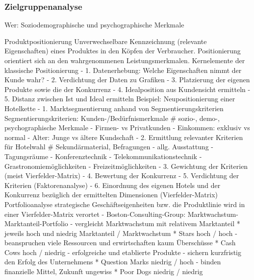 \subsubsection{Zielgruppenanalyse}
Wer: Soziodemographische und psychographische Merkmale      

Produktpositionierung
	Unverwechselbare Kennzeichnung (relevante Eigenschaften) eines
	Produktes in den Köpfen der Verbraucher. Positionierung orientiert
	sich an den wahrgenommenen Leistungsmerkmalen.
 Kernelemente der klassische Positionierung
	- 1. Datenerhebung: Welche Eigenschaften nimmt der Kunde wahr?
	- 2. Verdichtung der Daten zu Grafiken
	- 3. Platzierung der eigenen Produkte sowie die der Konkurrenz
	- 4. Idealposition aus Kundensicht ermitteln
	- 5. Distanz zwischen Ist und Ideal ermitteln
 Beispiel: Neupositionierung einer Hotelkette
	- 1. Marktsegmentierung anhand von Segmentierungskriterien
		Segmentierungskriterien: Kunden-/Bedürfnismerkmale
		# sozio-, demo-, psychographische Merkmale
		- Firmen- vs Privatkunden
		- Einkommen: exklusiv vs normal
		- Alter: Junge vs ältere Kundschaft
	- 2. Ermittlung relevanter Kriterien für Hotelwahl
		# Sekundärmaterial, Befragungen
		- allg. Ausstattung
		- Tagungsräume
		- Konferenztechnik
		- Telekommunikationstechnik
		- Grastronomiemöglichkeiten
		- Freizeitmöglichkeiten
	- 3. Gewichtung der Kriterien (meist Vierfelder-Matrix)
	- 4. Bewertung der Konkurrenz
	- 5. Verdichtung der Kriterien (Faktorenanalyse)
	- 6. Einordnung des eigenen Hotels und der Konkurrenz bezüglich der
	 ermittelten Dimensionen (Vierfelder-Matrix)
Portfolioanalyse
	strategische Geschäftseigenheiten bzw. die Produktlinie wird in einer
	Vierfelder-Matrix verortet
	- Boston-Consulting-Group: Marktwachstum-Marktanteil-Portfolio
		- vergleicht Marktwachstum mit relativem Marktanteil
		* jeweils hoch und niedrig
					Marktanteil	/ Marktwachstum
			* Stars			hoch	/ hoch
			 - beanspruchen viele Ressourcen und erwirtschaften
			   kaum Überschüsse
			* Cash Cows		hoch	/ niedrig
			 - erfolgreiche und etablierte Produkte
			 - sichern kurzfristig den Erfolg des Unternehmens
			* Question Marks	niedrig	/ hoch
			 - binden finanzielle Mittel, Zukunft ungewiss
			* Poor Dogs		niedrig	/ niedrig

